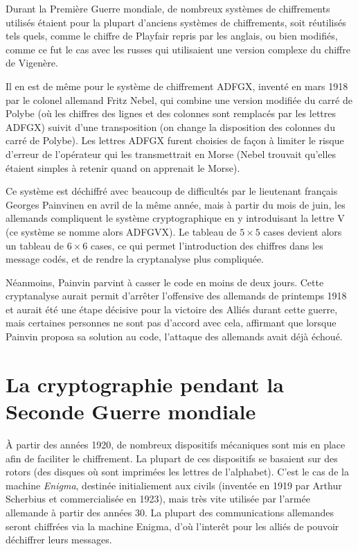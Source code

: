 Durant la Première Guerre mondiale, de nombreux systèmes de
chiffrements utilisés étaient pour la plupart d'anciens systèmes de
chiffrements, soit réutilisés tels quels, comme le chiffre de Playfair
repris par les anglais, ou bien modifiés, comme ce fut le cas
avec les russes qui utilisaient une version complexe du chiffre de
Vigenère.

Il en est de même pour le système de chiffrement ADFGX, inventé en
mars 1918 par le colonel allemand Fritz %
Nebel, qui combine une version modifiée
du carré de Polybe (où les chiffres des
lignes et des colonnes sont remplacés par les lettres ADFGX) suivit d'une
transposition (on change la disposition
des colonnes du carré de Polybe). Les lettres ADFGX furent choisies de
façon à limiter le risque d'erreur de l'opérateur qui les
transmettrait en Morse (Nebel trouvait qu'elles étaient simples à
retenir quand on apprenait le Morse).

Ce système est déchiffré avec beaucoup de difficultés par le
lieutenant français Georges Painvinen en avril de la même année, mais à
partir du mois de juin, les allemands compliquent le système
cryptographique en y introduisant la lettre V (ce système se nomme
alors ADFGVX). Le tableau de $5\times 5$ cases devient alors un tableau
de $6\times 6$ cases, ce qui permet l'introduction des chiffres dans
les message codés, et de rendre la cryptanalyse plus
compliquée.

Néanmoins, Painvin parvint à casser le code en moins de
deux jours. Cette cryptanalyse aurait permit d'arrêter l'offensive
des allemands de printemps 1918 et aurait été une étape décisive pour
la victoire des Alliés durant cette guerre, mais certaines personnes
ne sont pas d'accord avec cela, affirmant que lorsque Painvin proposa
sa solution au code, l'attaque des allemands avait déjà échoué. 
\section{La cryptographie pendant la Seconde Guerre mondiale}
À partir des années 1920, de nombreux dispositifs mécaniques sont mis
en place afin de faciliter le chiffrement. La plupart de ces
dispositifs se basaient sur des rotors (des disques où sont imprimées
les lettres de l'alphabet). C'est le cas de la machine \emph{Enigma},
destinée initialiement aux civils (inventée en 1919 par Arthur
Scherbius et commercialisée en 1923), mais très vite utilisée par
l'armée allemande à partir des années 30. La plupart des
communications allemandes seront chiffrées via la machine Enigma, d'où
l'interêt pour les alliés de pouvoir déchiffrer leurs messages.

